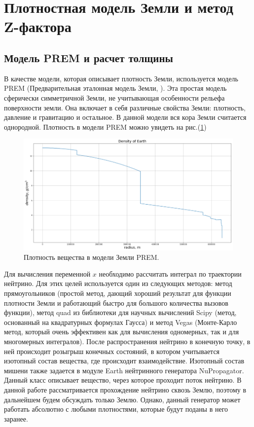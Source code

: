 \section{Плотностная модель Земли и метод Z-фактора}
\subsection{Модель PREM и расчет толщины}
В качестве модели, которая описывает плотность Земли, используется модель PREM (Предварительная эталонная модель Земли, \cite{dziewonskiPREM1981}). Эта простая модель сферически симметричной Земли, не учитывающая особенности рельефа поверхности земли.  Она включает в себя различные свойства Земли: плотность, давление и гравитацию и остальное.  В данной модели вся кора Земли считается однородной.  Плотность в модели PREM можно увидеть на рис.(\ref{PREM})
\begin{figure}[!h]
\centering
\includegraphics[width=\linewidth]{"images/NuProp/PREM.png"}
\caption{Плотность вещества в модели Земли PREM.}
\label{PREM}
\end{figure}


Для вычисления переменной $x$ необходимо рассчитать интеграл по траектории нейтрино. Для этих целей используется один из следующих методов: метод прямоугольников (простой метод, дающий хороший результат для функции плотности Земли и работающий быстро для большого количества вызовов функции), метод quad из библиотеки для научных вычислений Scipy (метод, основанный на квадратурных формулах Гаусса) и метод Vegas (Монте-Карло метод, который очень эффективен как для вычисления одномерных, так и для многомерных интегралов). После распространения нейтрино в конечную точку, в ней происходит розыгрыш конечных состояний, в котором учитывается изотопный состав вещества, где происходит взаимодействие. Изотопный состав мишени также задается в модуле Earth нейтринного генератора NuPropagator. 
Данный класс описывает вещество, через которое проходит поток нейтрино. В данной работе рассматривается прохождение нейтрино сквозь Землю, поэтому в дальнейшем будем обсуждать только Землю. Однако, данный генератор может работать абсолютно с любыми плотностями, которые будут поданы в него заранее. 

